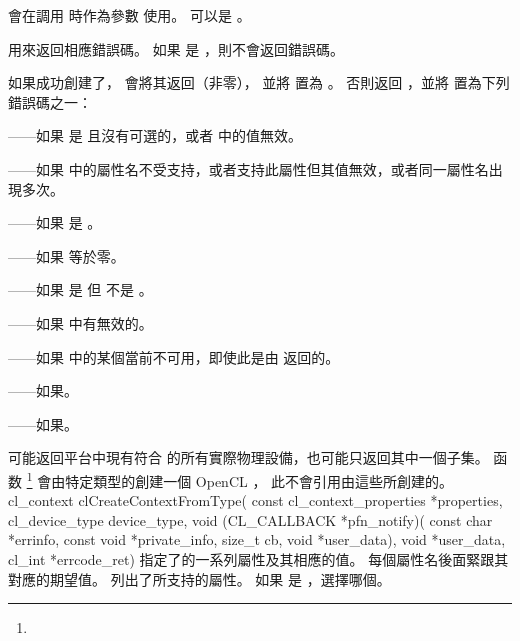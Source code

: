  會在調用  時作為參數  使用。
 可以是 。

 用來返回相應錯誤碼。
如果  是 ，則不會返回錯誤碼。

如果成功創建了， 會將其返回（非零），
並將  置為 。
否則返回 ，並將  置為下列錯誤碼之一：
\startigBase
\item {}——如果  是  且沒有可選的，或者  中的值無效。
\item {}——如果  中的屬性名不受支持，或者支持此屬性但其值無效，或者同一屬性名出現多次。
\item {}——如果  是 。
\item {}——如果  等於零。
\item {}——如果  是  但  不是 。
\item {}——如果  中有無效的。
\item {}——如果  中的某個當前不可用，即使此是由  返回的。
\item {}——如果\scdevfailres。
\item {}——如果\schostfailres。
\stopigBase

\startbuffer[footnotecccft]
 可能返回平台中現有符合  的所有實際物理設備，也可能只返回其中一個子集。
\stopbuffer
函数 \footnote{\getbuffer[footnotecccft]}
會由特定類型的創建一個 OpenCL ，
此不會引用由這些所創建的。
\startCLFUNC
cl_context clCreateContextFromType(
		const cl_context_properties *properties,
		cl_device_type device_type,
		void (CL_CALLBACK *pfn_notify)(
			const char *errinfo,
			const void *private_info,
			size_t cb,
			void *user_data),
		void *user_data,
		cl_int *errcode_ret)
\stopCLFUNC
{} 指定了的一系列屬性及其相應的值。
每個屬性名後面緊跟其對應的期望值。
列出了所支持的屬性。
如果  是 ，選擇哪個。

